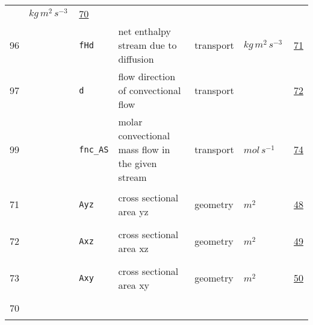 \begin{longtable}{|p{1cm}|p{2.5cm}|p{4.5cm}|p{8cm}|p{3.0cm}|p{3cm}|p{1cm}|}
             & $ kg \,m^{2} \,s^{-3} \, $
             &                 \hyperlink{"e:70"}{ 70 }
                 \\
        96
             & \hypertarget{"v:96"}{ $ {} $}
             & \verb|fHd|
             & net enthalpy stream due to diffusion
             & \begin{lay}transport \end{lay}
             & $ kg \,m^{2} \,s^{-3} \, $
             &                 \hyperlink{"e:71"}{ 71 }
                 \\
        97
             & \hypertarget{"v:97"}{ $ {} $}
             & \verb|d|
             & flow direction of convectional flow
             & \begin{lay}transport \end{lay}
             & $  $
             &                 \hyperlink{"e:72"}{ 72 }
                 \\
        99
             & \hypertarget{"v:99"}{ $ {} $}
             & \verb|fnc_AS|
             & molar convectional mass flow in the given stream
             & \begin{lay}transport \end{lay}
             & $ mol \,s^{-1} \, $
             &                 \hyperlink{"e:74"}{ 74 }
                 \\
        71
             & \hypertarget{"v:71"}{ $ {} $}
             & \verb|Ayz|
             & cross sectional area yz
             & \begin{lay}geometry \end{lay}
             & $ m^{2} \, $
             &                 \hyperlink{"e:48"}{ 48 }
                 \\
        72
             & \hypertarget{"v:72"}{ $ {} $}
             & \verb|Axz|
             & cross sectional area xz
             & \begin{lay}geometry \end{lay}
             & $ m^{2} \, $
             &                 \hyperlink{"e:49"}{ 49 }
                 \\
        73
             & \hypertarget{"v:73"}{ $ {} $}
             & \verb|Axy|
             & cross sectional area xy
             & \begin{lay}geometry \end{lay}
             & $ m^{2} \, $
             &                 \hyperlink{"e:50"}{ 50 }
                 \\
        70
             & \hypertarget{"v:70"}{ $ {} $}

\end{longtable}
